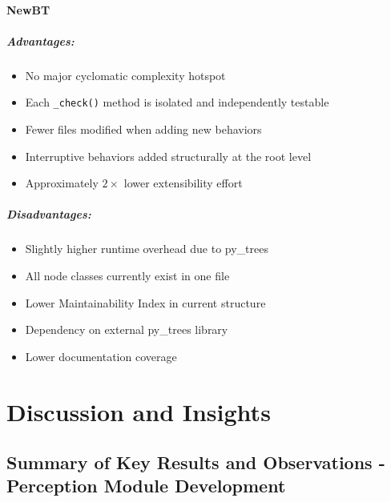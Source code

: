 \documentclass[12pt, a4paper]{report}
\begin{document}
\subsubsection{NewBT}

\paragraph{Advantages:}

\begin{itemize}
    \item No major cyclomatic complexity hotspot
    \item Each \texttt{\_check()} method is isolated and independently testable
    \item Fewer files modified when adding new behaviors
    \item Interruptive behaviors added structurally at the root level
    \item Approximately $2\times$ lower extensibility effort
\end{itemize}

\paragraph{Disadvantages:}

\begin{itemize}
    \item Slightly higher runtime overhead due to py\_trees
    \item All node classes currently exist in one file
    \item Lower Maintainability Index in current structure
    \item Dependency on external py\_trees library
    \item Lower documentation coverage
\end{itemize}


\chapter{Discussion and Insights}
\label{sec:discussion}
\section{Summary of Key Results and Observations - Perception Module Development }
\end{document}
